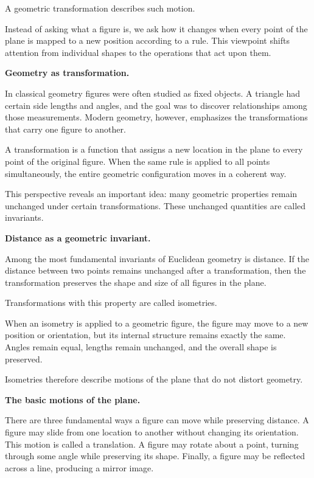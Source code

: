 \documentclass[11pt, openany]{book}
\theoremstyle{plain}
\theoremstyle{definition}
\theoremstyle{remark}
\begin{document}
A geometric transformation describes such motion.

Instead of asking what a figure is, we ask how it changes when every
point of the plane is mapped to a new position according to a rule.
This viewpoint shifts attention from individual shapes to the operations
that act upon them.

\medskip

\textbf{Geometry as transformation.}

In classical geometry figures were often studied as fixed objects. A
triangle had certain side lengths and angles, and the goal was to
discover relationships among those measurements. Modern geometry,
however, emphasizes the transformations that carry one figure to
another.

A transformation is a function that assigns a new location in the plane
to every point of the original figure. When the same rule is applied to
all points simultaneously, the entire geometric configuration moves in a
coherent way.

This perspective reveals an important idea: many geometric properties
remain unchanged under certain transformations. These unchanged
quantities are called invariants.

\medskip

\textbf{Distance as a geometric invariant.}

Among the most fundamental invariants of Euclidean geometry is distance.
If the distance between two points remains unchanged after a
transformation, then the transformation preserves the shape and size of
all figures in the plane.

Transformations with this property are called isometries.

When an isometry is applied to a geometric figure, the figure may move
to a new position or orientation, but its internal structure remains
exactly the same. Angles remain equal, lengths remain unchanged, and the
overall shape is preserved.

Isometries therefore describe motions of the plane that do not distort
geometry.

\medskip

\textbf{The basic motions of the plane.}

There are three fundamental ways a figure can move while preserving
distance. A figure may slide from one location to another without
changing its orientation. This motion is called a translation. A figure
may rotate about a point, turning through some angle while preserving
its shape. Finally, a figure may be reflected across a line, producing a
mirror image.
\end{document}
